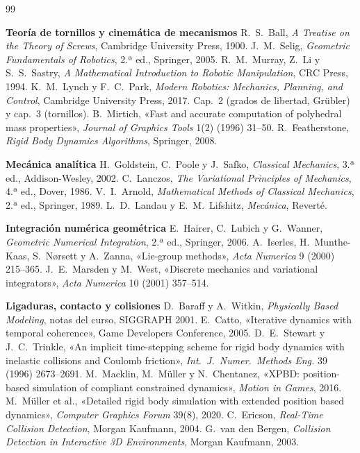 \documentclass[11pt,a4paper]{article}
\numberwithin{equation}{section}
\begin{document}
\begin{thebibliography}{99}
\item[] \textbf{Teoría de tornillos y cinemática de mecanismos}
 R.~S.~Ball, \emph{A Treatise on the Theory of Screws}, Cambridge University Press, 1900.
 J.~M.~Selig, \emph{Geometric Fundamentals of Robotics}, 2.ª ed., Springer, 2005.
 R.~M.~Murray, Z.~Li y S.~S.~Sastry, \emph{A Mathematical Introduction to Robotic Manipulation},
  CRC Press, 1994.
 K.~M.~Lynch y F.~C.~Park, \emph{Modern Robotics: Mechanics, Planning, and Control},
  Cambridge University Press, 2017. Cap.~2 (grados de libertad, Grübler) y cap.~3 (tornillos).
 B.~Mirtich, «Fast and accurate computation of polyhedral mass properties», \emph{Journal of
  Graphics Tools} 1(2) (1996) 31--50.
 R.~Featherstone, \emph{Rigid Body Dynamics Algorithms}, Springer, 2008.

\item[] \textbf{Mecánica analítica}
 H.~Goldstein, C.~Poole y J.~Safko, \emph{Classical Mechanics}, 3.ª ed., Addison-Wesley, 2002.
 C.~Lanczos, \emph{The Variational Principles of Mechanics}, 4.ª ed., Dover, 1986.
 V.~I.~Arnold, \emph{Mathematical Methods of Classical Mechanics}, 2.ª ed., Springer, 1989.
 L.~D.~Landau y E.~M.~Lifshitz, \emph{Mecánica}, Reverté.

\item[] \textbf{Integración numérica geométrica}
 E.~Hairer, C.~Lubich y G.~Wanner, \emph{Geometric Numerical Integration}, 2.ª ed., Springer, 2006.
 A.~Iserles, H.~Munthe-Kaas, S.~Nørsett y A.~Zanna, «Lie-group methods», \emph{Acta Numerica} 9
  (2000) 215--365.
 J.~E.~Marsden y M.~West, «Discrete mechanics and variational integrators», \emph{Acta
  Numerica} 10 (2001) 357--514.

\item[] \textbf{Ligaduras, contacto y colisiones}
 D.~Baraff y A.~Witkin, \emph{Physically Based Modeling}, notas del curso, SIGGRAPH 2001.
 E.~Catto, «Iterative dynamics with temporal coherence», Game Developers Conference, 2005.
 D.~E.~Stewart y J.~C.~Trinkle, «An implicit time-stepping scheme for rigid body dynamics
  with inelastic collisions and Coulomb friction», \emph{Int.\ J.\ Numer.\ Methods Eng.} 39 (1996) 2673--2691.
 M.~Macklin, M.~Müller y N.~Chentanez, «XPBD: position-based simulation of compliant constrained
  dynamics», \emph{Motion in Games}, 2016.
 M.~Müller et al., «Detailed rigid body simulation with extended position based dynamics»,
  \emph{Computer Graphics Forum} 39(8), 2020.
 C.~Ericson, \emph{Real-Time Collision Detection}, Morgan Kaufmann, 2004.
 G.~van den Bergen, \emph{Collision Detection in Interactive 3D Environments}, Morgan
  Kaufmann, 2003.


\end{thebibliography}
\end{document}
